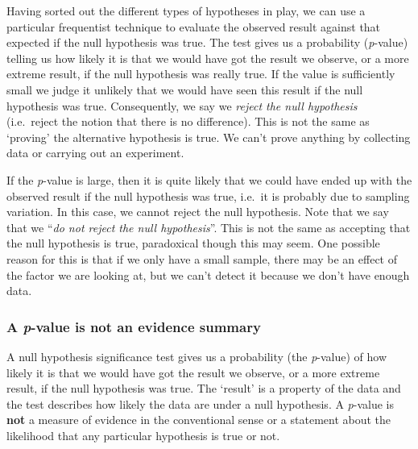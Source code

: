 \documentclass[
]{book}
\newenvironment{greybox}{
  \definecolor{shadecolor}{rgb}{0.95,0.95,0.95}  %
  \color{black}
  \begin{shaded}}
 {\end{shaded}}
\newenvironment{infobox}[1]
  {
  \begin{itemize}
  \renewcommand{\labelitemi}{
    \raisebox{-.7\height}[0pt][0pt]{
      {\setkeys{Gin}{width=3em,keepaspectratio}
        \texttt{[image: images/\#1]}}
    }
  }
  \setlength{\fboxsep}{1em}
  \begin{greybox}
  \item
  }
  {
  \end{greybox}
  \end{itemize}
  }
\begin{document}
Having sorted out the different types of hypotheses in play, we can use a particular frequentist technique to evaluate the observed result against that expected if the null hypothesis was true. The test gives us a probability (\emph{p}-value) telling us how likely it is that we would have got the result we observe, or a more extreme result, if the null hypothesis was really true. If the value is sufficiently small we judge it unlikely that we would have seen this result if the null hypothesis was true. Consequently, we say we \emph{reject the null hypothesis} (i.e.~reject the notion that there is no difference). This is not the same as `proving' the alternative hypothesis is true. We can't prove anything by collecting data or carrying out an experiment.

If the \emph{p}-value is large, then it is quite likely that we could have ended up with the observed result if the null hypothesis was true, i.e.~it is probably due to sampling variation. In this case, we cannot reject the null hypothesis. Note that we say that we ``\emph{do not reject the null hypothesis}''. This is not the same as accepting that the null hypothesis is true, paradoxical though this may seem. One possible reason for this is that if we only have a small sample, there may be an effect of the factor we are looking at, but we can't detect it because we don't have enough data.

\begin{infobox}{information}

\hypertarget{a-p-value-is-not-an-evidence-summary}{%
\subsubsection*{\texorpdfstring{A \emph{p}-value is not an evidence summary}{A p-value is not an evidence summary}}\label{a-p-value-is-not-an-evidence-summary}}

A null hypothesis significance test gives us a probability (the \emph{p}-value) of how likely it is that we would have got the result we observe, or a more extreme result, if the null hypothesis was true. The `result' is a property of the data and the test describes how likely the data are under a null hypothesis. A \emph{p}-value is \textbf{not} a measure of evidence in the conventional sense or a statement about the likelihood that any particular hypothesis is true or not.

\end{infobox}
\end{document}

